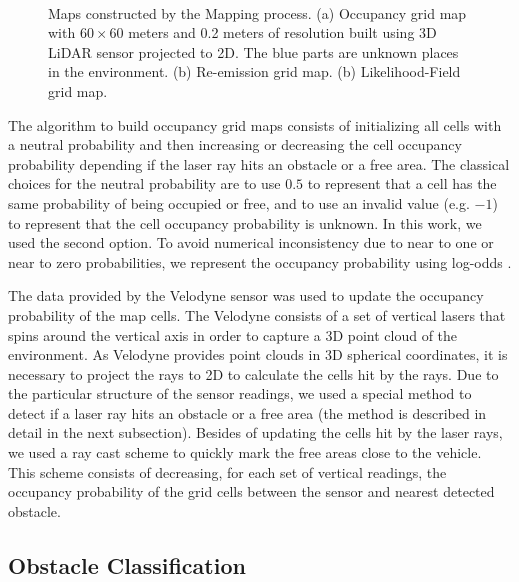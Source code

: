 \begin{figure}[t]
	\centering
	\\
	\caption{Maps constructed by the Mapping process. (a) Occupancy grid map with $60\times60$ meters and 0.2 meters of resolution built using 3D LiDAR sensor projected to 2D. The blue parts are unknown places in the environment. (b) Re-emission grid map. (b) Likelihood-Field grid map.}
	\label{Fig::FIGURE04}
\end{figure}

The algorithm to build occupancy grid maps consists of initializing all cells with a neutral probability and then increasing or decreasing the cell occupancy probability depending if the laser ray hits an obstacle or a free area. The classical choices for the neutral probability are to use $0.5$ to represent that a cell has the same probability of being occupied or free, and to use an invalid value (e.g. $-1$) to represent that the cell occupancy probability is unknown. In this work, we used the second option. To avoid numerical inconsistency due to near to one or near to zero probabilities, we represent the occupancy probability using log-odds \cite{26thrun2005probabilistic}.

The data provided by the Velodyne sensor was used to update the occupancy probability of the map cells. The Velodyne consists of a set of vertical lasers that spins around the vertical axis in order to capture a 3D point cloud of the environment. As Velodyne provides point clouds in 3D spherical coordinates, it is necessary to project the rays to 2D to calculate the cells hit by the rays. Due to the particular structure of the sensor readings, we used a special method to detect if a laser ray hits an obstacle or a free area (the method is described in detail in the next subsection). Besides of updating the cells hit by the laser rays, we used a ray cast scheme to quickly mark the free areas close to the vehicle. This scheme consists of decreasing, for each set of vertical readings, the occupancy probability of the grid cells between the sensor and nearest detected obstacle.

\subsection{Obstacle Classification}

